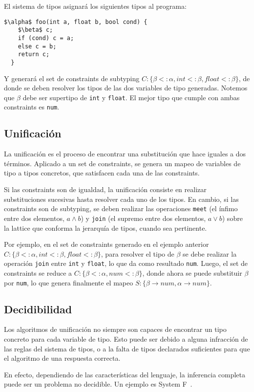 El sistema de tipos asignará los siguientes tipos al programa:
\begin{lstlisting}[mathescape=true]
  $\alpha$ foo(int a, float b, bool cond) {
    $\beta$ c;
    if (cond) c = a;
    else c = b;
    return c;
  }
\end{lstlisting}
Y generará el set de constraints de subtyping $C: \{\beta <: \alpha, int <: \beta, float <: \beta\}$, de donde se deben resolver los tipos de las dos variables de tipo generadas. Notemos que $\beta$ debe ser supertipo de \texttt{int} y \texttt{float}. El mejor tipo que cumple con ambas constraints es \texttt{num}.
\subsection{Unificación}
La unificación es el proceso de encontrar una substitución que hace iguales a dos términos. Aplicado a un set de constraints, se genera un mapeo de variables de tipo a tipos concretos, que satisfacen cada una de las constraints.

Si las constraints son de igualdad, la unificación consiste en realizar substituciones sucesivas hasta resolver cada uno de los tipos. En cambio, si las constraints son de subtyping, se deben realizar las operaciones \texttt{meet} (el ínfimo entre dos elementos, $a \wedge b$) y \texttt{join} (el supremo entre dos elementos, $a \vee b$) sobre la lattice que conforma la jerarquía de tipos, cuando sea pertinente.

Por ejemplo, en el set de constraints generado en el ejemplo anterior $C: \{\beta <: \alpha, int <: \beta, float <: \beta\}$, para resolver el tipo de $\beta$ se debe realizar la operación \texttt{join} entre \texttt{int} y \texttt{float}, lo que da como resultado \texttt{num}. Luego, el set de constraints se reduce a $C: \{\beta <: \alpha, num <: \beta\}$, donde ahora se puede substituir $\beta$ por \texttt{num}, lo que genera finalmente el mapeo $S: \{\beta \rightarrow num, \alpha \rightarrow num\}$.
\subsection{Decidibilidad}
Los algoritmos de unificación no siempre son capaces de encontrar un tipo concreto para cada variable de tipo. Esto puede ser debido a alguna infracción de las reglas del sistema de tipos, o a la falta de tipos declarados suficientes para que el algoritmo de una respuesta correcta.

En efecto, dependiendo de las características del lenguaje, la inferencia completa puede ser un problema no decidible. Un ejemplo es System F~\cite{WELLS1999111}.
